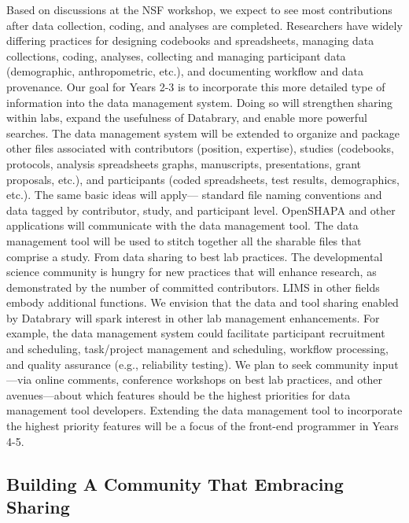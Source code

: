 \documentclass[letterpaper,man,apacite]{apa6}
\begin{document}
Based on discussions at the NSF workshop, we expect to see most contributions after data collection, coding, and analyses are completed. Researchers have widely differing practices for designing codebooks and spreadsheets, managing data collections, coding, analyses, collecting and managing participant data (demographic, anthropometric, etc.), and documenting workflow and data provenance. Our goal for Years 2-3 is to incorporate this more detailed type of information into the data management system. Doing so will strengthen sharing within labs, expand the usefulness of Databrary, and enable more powerful searches. The data management system will be extended to organize and package other files associated with contributors (position, expertise), studies (codebooks, protocols, analysis spreadsheets graphs, manuscripts, presentations, grant proposals, etc.), and participants (coded spreadsheets, test results, demographics, etc.). The same basic ideas will apply— standard file naming conventions and data tagged by contributor, study, and participant level. OpenSHAPA and other applications will communicate with the data management tool. The data management tool will be used to stitch together all the sharable files that comprise a study.
From data sharing to best lab practices. The developmental science community is hungry for new practices that will enhance research, as demonstrated by the number of committed contributors. LIMS in other fields embody additional functions. We envision that the data and tool sharing enabled by Databrary will spark interest in other lab management enhancements. For example, the data management system could facilitate participant recruitment and scheduling, task/project management and scheduling, workflow processing, and quality assurance (e.g., reliability testing). We plan to seek community input—via online comments, conference workshops on best lab practices, and other avenues—about which features should be the highest priorities for data management tool developers. Extending the data management tool to incorporate the highest priority features will be a focus of the front-end programmer in Years 4-5.

\subsection{Building A Community That Embracing Sharing}
\end{document}
